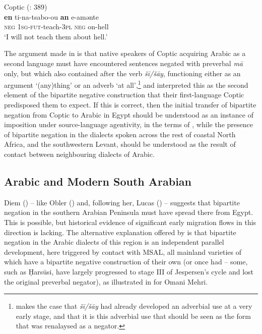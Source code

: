 \documentclass[output=paper]{langsci/langscibook}
\begin{document}
\ea\label{ex:key:cop}
{       Coptic (\citealt{LucasLash2010}: 389)}\\
\gll \textbf{en} ti-na-tsabo-ou \textbf{an} e-amənte\\
     \textsc{neg} \textsc{1sg-fut-}teach-\textsc{3pl} \textsc{neg} on-hell\\
\glt ‘I will not teach them about hell.’
\z

The argument made in \citet{LucasLash2010} is that native speakers of Coptic acquiring Arabic as a second language must have encountered sentences negated with preverbal \textit{mā} only, but which also contained after the verb \textit{šī/šāy}, functioning either as an argument ‘(any)thing’ or an adverb ‘at all’,\footnote{\citet{Diem2014} makes the case that \textit{šī/šāy} had already developed an adverbial use at a very early stage, and that it is this adverbial use that should be seen as the form that was renalaysed as a negator.} and interpreted this as the second element of the bipartite negative construction that their first-language Coptic predisposed them to expect. If this is correct, then the initial transfer of bipartite negation from Coptic to Arabic in Egypt should be understood as an instance of imposition under source-language agentivity, in the terms of \citet{VanCoetsem1988,VanCoetsem2000}, while the presence of bipartite negation in the dialects spoken across the rest of coastal North Africa, and the southwestern Levant, should be understood as the result of contact between neighbouring dialects of Arabic.



\subsection{Arabic and Modern South Arabian}


Diem (\citeyear[73]{Diem2014}) -- like Obler (\citeyear[148]{Obler1990}) and, following her, Lucas (\citeyear[416]{Lucas2007}) -- suggests that bipartite negation in the southern Arabian Peninsula must have spread there from Egypt. This is possible, but historical evidence of significant early migration flows in this direction is lacking. The alternative explanation offered by \citet{LucasLash2010} is that bipartite negation in the Arabic dialects of this region is an independent parallel development, here triggered by contact with MSAL, all mainland varieties of which have a bipartite negative construction of their own (or once had – some, such as Ḥarsūsi, have largely progressed to stage III of Jespersen’s cycle and lost the original preverbal negator), as illustrated in  for Omani Mehri.
\end{document}
